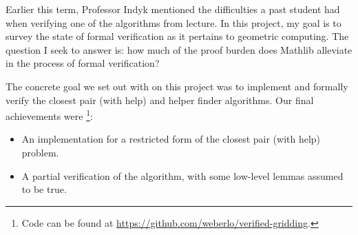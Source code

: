 \documentclass{article}
\begin{document}



Earlier this term, Professor Indyk mentioned the difficulties a past student had when verifying one of the algorithms from lecture.
In this project, my goal is to survey the state of formal verification as it pertains to geometric computing.
The question I seek to answer is: how much of the proof burden does Mathlib alleviate in the process of formal verification?




The concrete goal we set out with on this project was to implement and formally verify the closest pair (with help) and helper finder algorithms.
Our final achievements were
\footnote{
  Code can be found at \href{https://github.com/weberlo/verified-gridding}{https://github.com/weberlo/verified-gridding}.
}:
\begin{itemize}
  \item An implementation for a restricted form of the closest pair (with help) problem.
  \item A partial verification of the algorithm, with some low-level lemmas assumed to be true.
\end{itemize}
\end{document}
